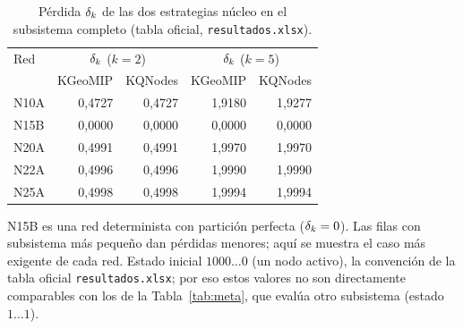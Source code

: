 \documentclass[11pt,letterpaper]{article}
\begin{document}
\begin{table}[H]
	\centering\footnotesize
	\caption{Pérdida $\delta_k$ de las dos estrategias núcleo en el subsistema completo
		(tabla oficial, \texttt{resultados.xlsx}).}
	\begin{tabular}{@{}lrrrr@{}}
		\toprule
		Red  & \multicolumn{2}{c}{$\delta_k$ ($k=2$)} & \multicolumn{2}{c}{$\delta_k$ ($k=5$)}                     \\
		     & KGeoMIP                           & KQNodes                           & KGeoMIP & KQNodes \\
		\midrule
		N10A & 0,4727                            & 0,4727                            & 1,9180  & 1,9277  \\
		N15B & 0,0000                            & 0,0000                            & 0,0000  & 0,0000  \\
		N20A & 0,4991                            & 0,4991                            & 1,9970  & 1,9970  \\
		N22A & 0,4996                            & 0,4996                            & 1,9990  & 1,9990  \\
		N25A & 0,4998                            & 0,4998                            & 1,9994  & 1,9994  \\
		\bottomrule
	\end{tabular}
	\label{tab:loss}
	\par\smallskip
	{\footnotesize N15B es una red determinista con partición perfecta ($\delta_k=0$). Las
		filas con subsistema más pequeño dan pérdidas menores; aquí se muestra el caso más
		exigente de cada red. Estado inicial $1000\dots0$ (un nodo activo), la convención de
		la tabla oficial \texttt{resultados.xlsx}; por eso estos valores no son directamente
		comparables con los de la Tabla~\ref{tab:meta}, que evalúa otro subsistema (estado
		$1\dots1$).}
\end{table}
\end{document}

